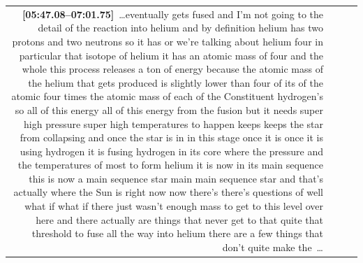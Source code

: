 \documentclass[10pt]{article}
\begin{document}
\begin{tiny}
\begin{longtable}{r p{0.3in} p{1.212in} p{3.8in}}
                                                                                                                                                                                                                                                                                                                                                                                                                                                                                                                                                                                                                                                 \textbf{[05:47.08--07:01.75]}~\ldots eventually gets fused and I'm not going to the detail of the reaction into helium and by definition helium has two protons and two neutrons so it has or we're talking about helium four in particular that isotope of helium it has an atomic mass of four and the whole this process releases a ton of energy because the atomic mass of the helium that gets produced is slightly lower than four of its of the atomic four times the atomic mass of each of the Constituent hydrogen's so all of this energy all of this energy from the fusion but it needs super high pressure super high temperatures to happen keeps keeps the star from collapsing and once the star is in in this stage once it is once it is using hydrogen it is fusing hydrogen in its core where the pressure and the temperatures of most to form helium it is now in its main sequence this is now a main sequence star main main sequence star and that's actually where the Sun is right now now there's there's questions of well what if what if there just wasn't enough mass to get to this level over here and there actually are things that never get to that quite that threshold to fuse all the way into helium there are a few things that don't quite make the~\ldots \\

\end{longtable}
\end{tiny}
\end{document}
